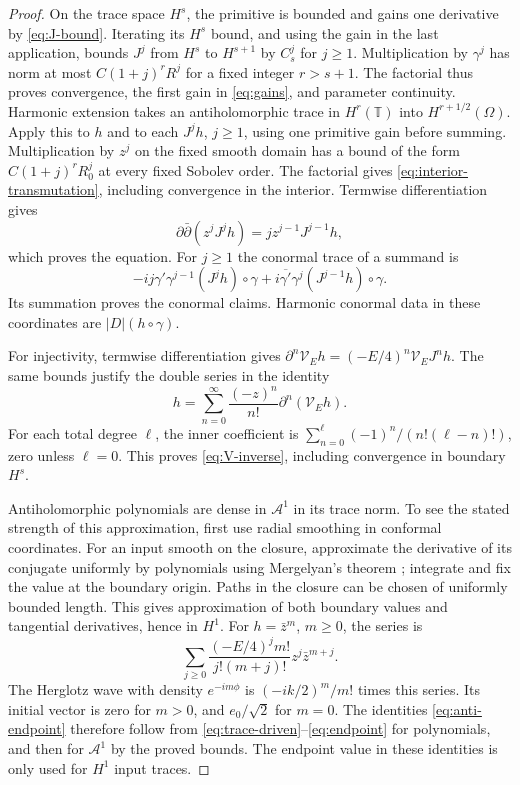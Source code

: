 \documentclass[11pt]{amsart}
\numberwithin{equation}{section}
\newcommand{\T}{\mathbb T}
\newcommand{\VV}{\mathcal V}
\begin{document}
\begin{proof}
On the trace space $H^s$, the primitive is bounded and gains one
derivative by \eqref{eq:J-bound}. Iterating its $H^s$ bound, and
using the gain in the last application, bounds $J^j$ from $H^s$
to $H^{s+1}$ by $C_s^j$ for $j\ge1$. Multiplication by $\gamma^j$ has norm at
most $C(1+j)^rR^j$ for a fixed integer $r>s+1$. The factorial thus
proves convergence, the first gain in \eqref{eq:gains}, and parameter
continuity. Harmonic extension takes an antiholomorphic trace in
$H^r(\T)$ into $H^{r+1/2}(\Omega)$. Apply this to $h$ and to each
$J^jh$, $j\ge1$, using one primitive gain before summing. Multiplication
by $z^j$ on the fixed smooth domain has a bound of the form
$C(1+j)^r R_0^j$ at every fixed Sobolev order. The factorial gives
\eqref{eq:interior-transmutation}, including convergence in the interior.
Termwise differentiation gives
\[
 \partial\bar\partial(z^jJ^jh)=jz^{j-1}J^{j-1}h,
\]
which proves the equation. For $j\ge1$ the conormal trace of a summand is
\[
 -ij\gamma'\gamma^{j-1}(J^jh)\circ\gamma
 +i\overline{\gamma'}\gamma^j(J^{j-1}h)\circ\gamma.
\]
Its summation proves the conormal claims. Harmonic conormal data in these
coordinates are $|D|(h\circ\gamma)$.

For injectivity, termwise differentiation gives
$\partial^n\VV_Eh=(-E/4)^n\VV_EJ^nh$. The same bounds justify the double
series in the identity
\begin{equation}\label{eq:V-inverse}
 h=\sum_{n=0}^\infty\frac{(-z)^n}{n!}\partial^n(\VV_Eh).
\end{equation}
For each total degree $\ell$, the inner coefficient is
$\sum_{n=0}^\ell(-1)^n/(n!(\ell-n)!)$, zero unless $\ell=0$.
This proves \eqref{eq:V-inverse}, including convergence in boundary $H^s$.

Antiholomorphic polynomials are dense in $\mathscr A^1$ in its trace
norm. To see the stated strength of this approximation, first use radial
smoothing in conformal coordinates. For an input smooth on the closure,
approximate the derivative of its conjugate uniformly by polynomials
using Mergelyan's theorem \cite{Rudin}; integrate and fix the value at the
boundary origin. Paths in the closure can be chosen of uniformly bounded
length. This gives approximation of both boundary values and tangential
derivatives, hence in $H^1$. For $h=\bar z^m$, $m\ge0$, the series is
\[
 \sum_{j\ge0}\frac{(-E/4)^jm!}{j!(m+j)!}z^j\bar z^{m+j}.
\]
The Herglotz wave with density $e^{-im\phi}$ is
$(-ik/2)^m/m!$ times this series. Its initial vector is zero for $m>0$, and
$e_0/\sqrt2$ for $m=0$. The identities \eqref{eq:anti-endpoint} therefore
follow from \eqref{eq:trace-driven}--\eqref{eq:endpoint} for polynomials,
and then for $\mathscr A^1$ by the proved bounds. The endpoint value in these identities is only used for $H^1$
input traces.
\end{proof}
\end{document}
